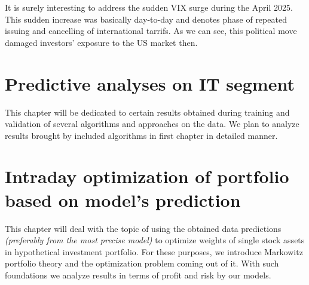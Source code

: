 It is surely interesting to address the sudden VIX surge during the April 2025. This sudden increase was basically day-to-day and denotes 
phase of repeated issuing and cancelling of international tarrifs. As we can see, this political move damaged investors' exposure to the US market then.

\chapter{Predictive analyses on IT segment}

This chapter will be dedicated to certain results obtained during training and validation of several algorithms and approaches on the data.
We plan to analyze results brought by included algorithms in first chapter in detailed manner.

\chapter{Intraday optimization of portfolio based on model's prediction}

This chapter will deal with the topic of using the obtained data predictions \textit{(preferably from the most precise model)} to optimize weights
of single stock assets in hypothetical investment portfolio. For these purposes, we introduce Markowitz portfolio theory and the optimization 
problem coming out of it. With such foundations we analyze results in terms of profit and risk by our models.
